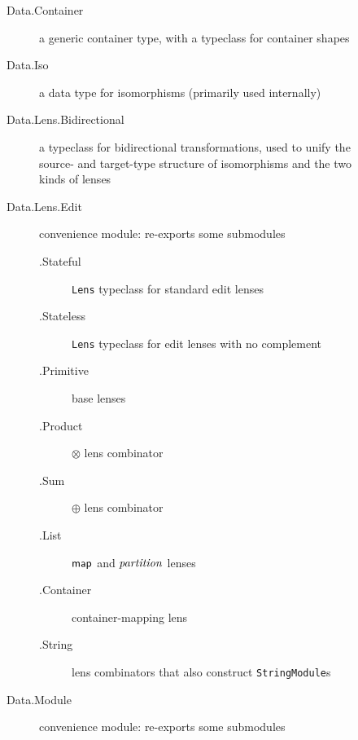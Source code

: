 \begin{figure}
    \centering
    \begin{description}
        \item[Data.Container] a generic container type, with a typeclass for
            container shapes
        \item[Data.Iso] a data type for isomorphisms (primarily used internally)
        \item[Data.Lens.Bidirectional] a typeclass for bidirectional
            transformations, used to unify the source- and target-type
            structure of isomorphisms and the two kinds of lenses
        \item[Data.Lens.Edit] convenience module: re-exports some submodules

            \begin{description}
                \item[.Stateful] \texttt{Lens} typeclass for standard edit
                    lenses
                \item[.Stateless] \texttt{Lens} typeclass for edit lenses
                    with no complement
                \item[.Primitive] base lenses
                \item[.Product] $\otimes$ lens combinator
                \item[.Sum] $\oplus$ lens combinator
                \item[.List] $\mathsf{map}$ and $\mathit{partition}$ lenses
                \item[.Container] container-mapping lens
                \item[.String] lens combinators that also construct
                    \texttt{StringModule}s
            \end{description}
        \item[Data.Module] convenience module: re-exports some submodules


\end{description}
\end{figure}
